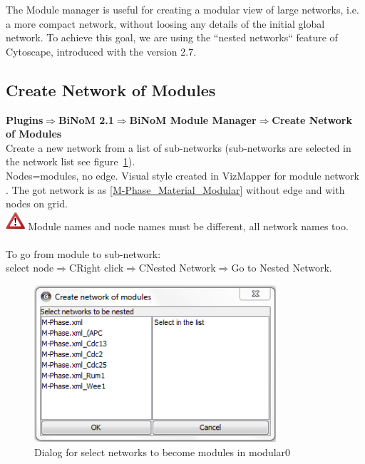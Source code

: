 The Module manager is useful for creating a modular view of large networks, i.e.
a more compact network,  without loosing any details of the initial global
network. To achieve this goal, we are using the ``nested networks`` feature of Cytoscape, introduced with the version 2.7.

\subsection{Create Network of Modules}
\textbf{Plugins$\Rightarrow$BiNoM 2.1$\Rightarrow$BiNoM Module Manager$\Rightarrow$Create Network of Modules}\\
Create a new network from a list of sub-networks (sub-networks are selected in the network list see figure~\ref{Create_network_of_modules}).\\
Nodes=modules, no edge. Visual style created in VizMapper for module network . The got network is as \ref{M-Phase_Material_Modular} without edge and with nodes on grid.\\
\includegraphics[width=20pt,height=20pt]{graphics/warning} Module names and node names must be different, all network names too.\\\\
To go from module to sub-network:\\
select node$\Rightarrow$CRight click$\Rightarrow$CNested Network$\Rightarrow$Go to Nested Network.
\begin{figure}
\centering
\includegraphics[width=0.8\textwidth]{graphics/Create_network_of_modules}
\caption{Dialog for select networks to become modules in modular0}
\label{Create_network_of_modules}
\end{figure}

